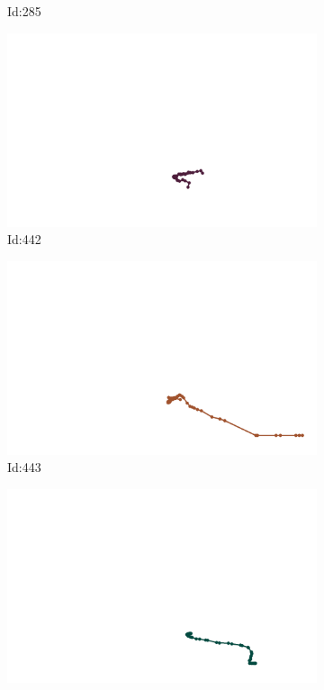 \documentclass[12pt,twoside]{report}
\begin{document}
\begin{figure}
\begin{subfigure}[b]{0.20\textwidth}
\caption{Id:285}
\end{subfigure}
\begin{subfigure}[b]{0.20\textwidth}
\centering
\includegraphics[width=\textwidth]{../trajectories/442.png}
\caption{Id:442}
\end{subfigure}
\begin{subfigure}[b]{0.20\textwidth}
\centering
\includegraphics[width=\textwidth]{../trajectories/443.png}
\caption{Id:443}
\end{subfigure}
\begin{subfigure}[b]{0.20\textwidth}
\centering
\includegraphics[width=\textwidth]{../trajectories/444.png}

\end{subfigure}
\end{figure}
\end{document}
